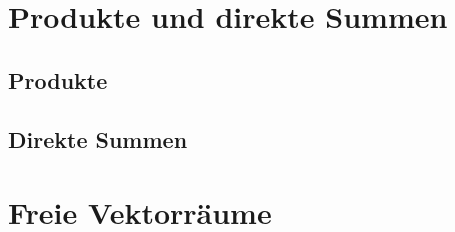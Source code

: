 \section{Produkte und direkte Summen}


\subsection{Produkte}


\subsection{Direkte Summen}





\section{Freie Vektorräume}








